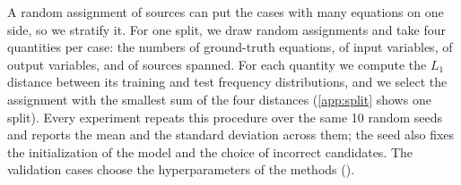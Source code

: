 A random assignment of sources can put the cases with many equations on one side, so we stratify
it. For one split, we draw \NSplitCandidates{} random assignments and take four quantities per
case: the numbers of ground-truth equations, of input variables, of output variables, and of
sources spanned. For each quantity we compute the $L_1$ distance between its training and test
frequency distributions, and we select the assignment with the smallest sum of the four distances
(\ref{app:split} shows one split).
Every experiment repeats this procedure over the same 10 random seeds and reports the mean and the
standard deviation across them; the seed also fixes the initialization of the model and the choice
of incorrect candidates. The validation cases choose the hyperparameters of the methods
().
